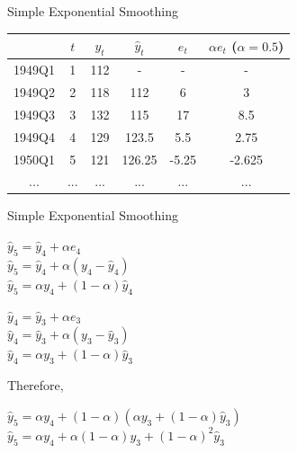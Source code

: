 \documentclass{beamer}\usepackage[]{graphicx}\usepackage[]{color}
\begin{document}
\begin{darkframes}
\begin{frame}[fragile]{Simple Exponential Smoothing}
\begin{center}
          \begin{tabular}{cccccc}
          \hline
             &  $t$ & $y_t$ & $\hat{y}_t$ & $e_t$ & $\alpha e_t$ ($\alpha=0.5$) \\
          \hline
          1949Q1	&	1	&	112	&	-	&	-	&	-           \\
          1949Q2	&	2	&	118	&	112	&	6	&	3         \\
          1949Q3	&	3	&	132	&	115	&	17	&	8.5     \\
          1949Q4	&	4	&	129	&	123.5	&	5.5	&	2.75  \\   
          1950Q1	&	5	&	121	&	126.25	&	-5.25	&	-2.625  \\
          ...	&	...	&	...	&	...	&	...	&	... \\
            \hline 
        \end{tabular}
      \end{center}
    
    \end{frame}
    
    
    
    \begin{frame}[fragile]{Simple Exponential Smoothing}
     \fontsize{9}{9}\selectfont
      \begin{center}
          $ \hat{y}_5 = \hat{y}_4 + \alpha e_4 $ \\ 
          $ \hat{y}_5 = \hat{y}_4 + \alpha (y_4 - \hat{y}_4) $ \\  
          $ \hat{y}_5 = \alpha y_4 + (1-\alpha) \hat{y}_4 $ \\  \bigskip
          
          $ \hat{y}_4 = \hat{y}_3 + \alpha e_3 $ \\ 
          $ \hat{y}_4 = \hat{y}_3 + \alpha (y_3 - \hat{y}_3) $ \\  
          $ \hat{y}_4 = \alpha y_3 + (1-\alpha) \hat{y}_3 $ \\  \bigskip
          
          Therefore,
          
          $ \hat{y}_5 = \alpha y_4 + (1-\alpha) (\alpha y_3 + (1-\alpha) \hat{y}_3) $ \\
          $ \hat{y}_5 = \alpha y_4 + \alpha (1-\alpha)y_3 + (1-\alpha)^2 \hat{y}_3 $ \\ \bigskip
    
      \end{center}
    \end{frame}
    
    
    

\end{darkframes}
\end{document}
